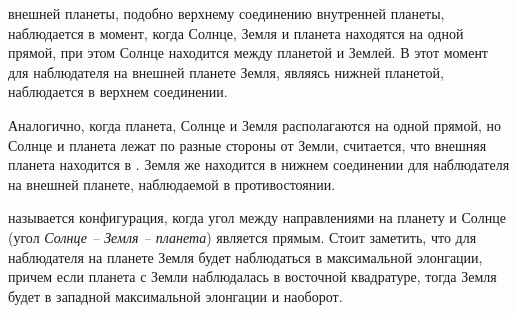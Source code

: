  внешней планеты, подобно верхнему соединению внутренней планеты, наблюдается в момент, когда Солнце, Земля и планета находятся на одной прямой, при этом Солнце находится между планетой и Землей. В этот момент для наблюдателя на внешней планете Земля, являясь нижней планетой, наблюдается в верхнем соединении.

Аналогично, когда планета, Солнце и Земля располагаются на одной прямой, но Солнце и планета лежат по разные стороны от Земли, считается, что внешняя планета находится в . Земля же находится в нижнем соединении для наблюдателя на внешней планете, наблюдаемой в противостоянии.

 называется конфигурация, когда угол между направлениями на планету и Солнце (угол {\slshape Солнце -- Земля -- планета}) является прямым. Стоит заметить, что для наблюдателя на планете Земля будет наблюдаться в максимальной элонгации, причем если планета с Земли наблюдалась в восточной квадратуре, тогда Земля будет в западной максимальной элонгации и наоборот.

